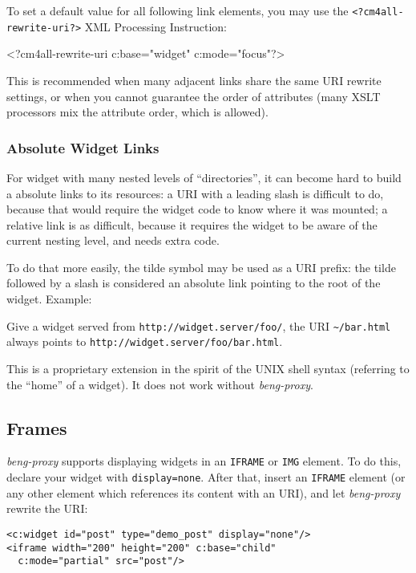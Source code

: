 \documentclass[a4paper,12pt]{article}
\begin{document}
To set a default value for all following link elements, you may use
the \texttt{<?cm4all-rewrite-uri?>} XML Processing Instruction:

\begin{verbatim*}
<?cm4all-rewrite-uri c:base="widget" c:mode="focus"?>
\end{verbatim*}

This is recommended when many adjacent links share the same URI
rewrite settings, or when you cannot guarantee the order of attributes
(many XSLT processors mix the attribute order, which is allowed).

\subsubsection{Absolute Widget Links}

For widget with many nested levels of ``directories'', it can become
hard to build a absolute links to its resources: a URI with a leading
slash is difficult to do, because that would require the widget code
to know where it was mounted; a relative link is as difficult, because
it requires the widget to be aware of the current nesting level, and
needs extra code.

To do that more easily, the tilde symbol may be used as a URI prefix:
the tilde followed by a slash is considered an absolute link pointing
to the root of the widget.  Example:

Give a widget served from \texttt{http://widget.server/foo/}, the URI
\texttt{\~{}/bar.html} always points to
\texttt{http://widget.server/foo/bar.html}.

This is a proprietary extension in the spirit of the UNIX shell syntax
(referring to the ``home'' of a widget).  It does not work without
\emph{beng-proxy}.

\subsection{Frames}
\label{frames}

\emph{beng-proxy} supports displaying widgets in an \texttt{IFRAME} or
\texttt{IMG} element.  To do this, declare your widget with
\texttt{display=none}.  After that, insert an \texttt{IFRAME} element
(or any other element which references its content with an URI), and
let \emph{beng-proxy} rewrite the URI:

\begin{verbatim}
<c:widget id="post" type="demo_post" display="none"/>
<iframe width="200" height="200" c:base="child"
  c:mode="partial" src="post"/>
\end{verbatim}
\end{document}

